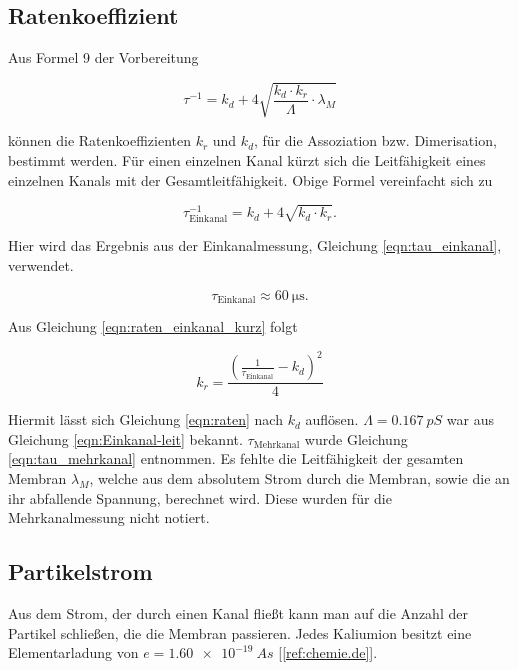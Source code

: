 \documentclass[a4paper,ngerman]{scrartcl}
\begin{document}
\subsection{Ratenkoeffizient}

Aus Formel 9 der Vorbereitung

\begin{equation}
\label{eqn:raten}
\tau^{-1} = k_d + 4 \sqrt{\frac{k_d \cdot k_r}{\Lambda}  \cdot \lambda_M} 
\end{equation}

können die Ratenkoeffizienten $k_{r}$ und $k_{d}$, für die Assoziation bzw. Dimerisation, bestimmt werden. Für einen einzelnen Kanal kürzt sich die Leitfähigkeit eines einzelnen Kanals mit der Gesamtleitfähigkeit. Obige Formel vereinfacht sich zu

\begin{equation}
\label{eqn:raten_einkanal_kurz}
\tau_{\text{Einkanal}}^{-1} = k_d + 4 \sqrt{k_d \cdot k_r }.
\end{equation}

Hier wird das Ergebnis aus der Einkanalmessung, Gleichung \ref{eqn:tau_einkanal}, verwendet.

\begin{equation}
\tau_{\text{Einkanal}} \approx \SI{60}{\micro\s}.
\end{equation}

Aus Gleichung \ref{eqn:raten_einkanal_kurz} folgt

\begin{equation}
k_{r} = \frac{ \left( \frac{1}{\tau_{\text{Einkanal}}} -k_d \right)^2 }{4}
\end{equation}
 
Hiermit lässt sich Gleichung \ref{eqn:raten} nach $k_d$ auflösen. $\Lambda = \SI{0.167}{pS}$ war aus Gleichung \ref{eqn:Einkanal-leit} bekannt. $\tau_{\text{Mehrkanal}}$ wurde Gleichung \ref{eqn:tau_mehrkanal} entnommen. 
Es fehlte die Leitfähigkeit der gesamten Membran $\lambda_M$, welche aus dem absolutem Strom durch die Membran, sowie die an ihr abfallende Spannung, berechnet wird. Diese wurden für die Mehrkanalmessung nicht notiert.


\subsection{Partikelstrom}

Aus dem Strom, der durch einen Kanal fließt kann man auf die Anzahl der Partikel schließen, die die Membran passieren. Jedes Kaliumion besitzt eine Elementarladung von $e = \SI{1.60e-19}{As}$ [\ref{ref:chemie.de}].
\end{document}
